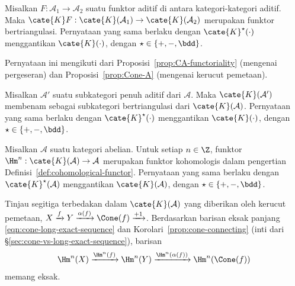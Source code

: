 \begin{proposisi}\label{prop:functor-induces-triangulated}
	Misalkan $F: \mathcal{A}_1 \to \mathcal{A}_2$ suatu funktor aditif di antara
	kategori-kategori aditif. Maka
	$\cate{K}F: \cate{K}(\mathcal{A}_1) \to \cate{K}(\mathcal{A}_2)$ merupakan
	funktor bertriangulasi. Pernyataan yang sama berlaku dengan
	$\cate{K}^\star(\cdot)$ menggantikan $\cate{K}(\cdot)$, dengan
	$\star \in \{+, -, \bdd\}$.
\end{proposisi}

\begin{bukti}
	Pernyataan ini mengikuti dari Proposisi~\ref{prop:CA-functoriality}
	(mengenai pergeseran) dan Proposisi~\ref{prop:Cone-A}
	(mengenai kerucut pemetaan).
\end{bukti}

\begin{korolari}\label{prop:subcat-K-triangulated}
	Misalkan $\mathcal{A}'$ suatu subkategori penuh aditif dari $\mathcal{A}$.
	Maka $\cate{K}(\mathcal{A}')$ membenam sebagai subkategori bertriangulasi
	dari $\cate{K}(\mathcal{A})$. Pernyataan yang sama berlaku dengan
	$\cate{K}^\star(\cdot)$ menggantikan $\cate{K}(\cdot)$, dengan
	$\star \in \{+, -, \bdd\}$.
\end{korolari}

\begin{proposisi}
	Misalkan $\mathcal{A}$ suatu kategori abelian. Untuk setiap $n \in \Z$,
	funktor $\Hm^n: \cate{K}(\mathcal{A}) \to \mathcal{A}$ merupakan funktor
	kohomologis dalam pengertian Definisi~\ref{def:cohomological-functor}.
	Pernyataan yang sama berlaku dengan $\cate{K}^\star(\mathcal{A})$
	menggantikan $\cate{K}(\mathcal{A})$, dengan
	$\star \in \{+, -, \bdd\}$.
\end{proposisi}

\begin{bukti}
	Tinjau segitiga terbedakan dalam $\cate{K}(\mathcal{A})$ yang diberikan oleh
	kerucut pemetaan,
	$X \xrightarrow{f} Y \xrightarrow{\alpha(f)} \Cone(f) \xrightarrow{+1}$.
	Berdasarkan barisan eksak panjang
	\eqref{eqn:cone-long-exact-sequence} dan
	Korolari~\ref{prop:cone-connecting} (inti dari
	\S\ref{sec:cone-vs-long-exact-sequence}), barisan
	\[ \Hm^n(X) \xrightarrow{\Hm^n(f)} \Hm^n(Y) \xrightarrow{\Hm^n(\alpha(f))} \Hm^n(\Cone(f)) \]
	memang eksak.
\end{bukti}

